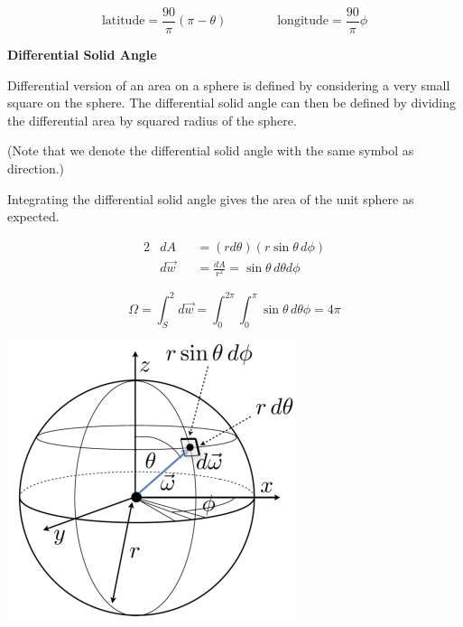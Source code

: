 \documentclass{article}
\begin{document}
\[
    \text{latitude} = \frac{90}{\pi} (\pi-\theta) \qquad \qquad \text{longitude} = \frac{90}{\pi} \phi
\]

\vspace{5px}

\textbf{Differential Solid Angle}

\vspace{5px}

Differential version of an area on a sphere is defined by considering a very small square on the sphere.
The differential solid angle can then be defined by dividing the differential area by squared radius of 
the sphere.

\vspace{5px}

(Note that we denote the differential solid angle with the same symbol as direction.)

\vspace{10px}

Integrating the differential solid angle gives the area of the unit sphere as expected.

\begin{minipage}{0.6\textwidth}
    \begin{alignat*}{2}
        &dA &&= (r d \theta) (r \sin \theta \, d \phi)\\
        &d \vec{w} &&= \frac{dA}{r^2} = \sin \theta \, d \theta d \phi
    \end{alignat*}

    \[
        \Omega = \int_S^2 d \vec{w} = \int_0^{2\pi} \int_0^{\pi} \sin \theta \, d \theta \phi = 4\pi
    \]
\end{minipage}
\begin{minipage}{0.3\textwidth}
        \includegraphics[width=0.9\linewidth]{images/diff_solid_angle.png}
\end{minipage}
\end{document}
